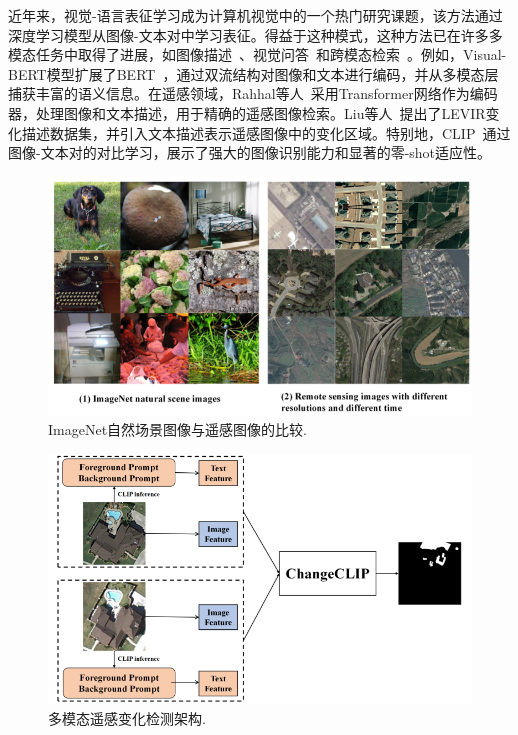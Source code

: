 近年来，视觉-语言表征学习成为计算机视觉中的一个热门研究课题，该方法通过深度学习模型从图像-文本对中学习表征。得益于这种模式，这种方法已在许多多模态任务中取得了进展，如图像描述~\cite{Chen2021VisualGPTDA}、视觉问答~\cite{Song2022CLIPMA}和跨模态检索~\cite{Tang2023InteractingEnhancingFT}。例如，Visual-BERT模型扩展了BERT~\cite{Devlin2019BERTPO}，通过双流结构对图像和文本进行编码，并从多模态层捕获丰富的语义信息。在遥感领域，Rahhal等人~\cite{AlRahhal2022MultilanguageTF}采用Transformer网络作为编码器，处理图像和文本描述，用于精确的遥感图像检索。Liu等人~\cite{Liu2022RemoteSI}提出了LEVIR变化描述数据集，并引入文本描述表示遥感图像中的变化区域。特别地，CLIP~\cite{Radford2021LearningTV}通过图像-文本对的对比学习，展示了强大的图像识别能力和显著的零-shot适应性。

\begin{figure}[!htbp]
  \centering
  \includegraphics[width=\textwidth]{paper_figures/基于AI基础模型微调的变化检测模型研究/ChangeCLIP/changeclip2.png}
  \caption{ImageNet自然场景图像与遥感图像的比较.}
  \label{fig:changeclip2}
\end{figure}

\begin{figure}[!htbp]
  \centering
  \includegraphics[width=\textwidth]{paper_figures/基于AI基础模型微调的变化检测模型研究/ChangeCLIP/changeclip1.png}
  \caption{多模态遥感变化检测架构.}
  \label{fig:changeclip1}
\end{figure}




